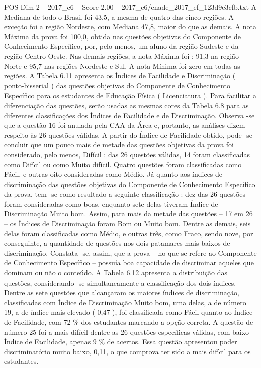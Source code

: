 \begin{textsample}{POS Dim 2 – 2017\_c6 – Score 2.00 – 2017\_c6/enade\_2017\_ef\_123d9e3cfb.txt}
A Mediana de todo o Brasil foi 43,5, a mesma de quatro das cinco regiões.
A exceção foi a região Nordeste, com Mediana 47,8, maior do que as demais.
A nota Máxima da prova foi 100,0, obtida nas questões objetivas do Componente de Conhecimento Específico, por, pelo menos, um aluno da região Sudeste e da região Centro-Oeste.
Nas demais regiões, a nota Máxima foi : 91,3 na região Norte e 95,7 nas regiões Nordeste e Sul.
A nota Mínima foi zero em todas as regiões.
A Tabela 6.11 apresenta os Índices de Facilidade e Discriminação ( ponto-bisserial ) das questões objetivas do Componente de Conhecimento Específico para os estudantes de Educação Física ( Licenciatura ).
Para facilitar a diferenciação das questões, serão usadas as mesmas cores da Tabela 6.8 para as diferentes classificações dos Índices de Facilidade e de Discriminação.
Observa -se que a questão 16 foi anulada pela CAA da Área e, portanto, as análises dizem respeito às 26 questões válidas.
A partir do Índice de Facilidade obtido, pode -se concluir que um pouco mais de metade das questões objetivas da prova foi considerado, pelo menos, Difícil : das 26 questões válidas, 14 foram classificadas como Difícil ou como Muito difícil.
Quatro questões foram classificadas como Fácil, e outras oito consideradas como Médio.
Já quanto aos índices de discriminação das questões objetivas do Componente de Conhecimento Específico da prova, tem -se como resultado a seguinte classificação : dez das 26 questões foram consideradas como boas, enquanto sete delas tiveram Índice de Discriminação Muito bom.
Assim, para mais da metade das questões – 17 em 26 – os Índices de Discriminação foram Bom ou Muito bom.
Dentre as demais, seis delas foram classificadas como Médio, e outras três, como Fraco, sendo nove, por conseguinte, a quantidade de questões nos dois patamares mais baixos de discriminação.
Constata -se, assim, que a prova – no que se refere ao Componente de Conhecimento Específico – possuía boa capacidade de discriminar aqueles que dominam ou não o conteúdo.
A Tabela 6.12 apresenta a distribuição das questões, considerando -se simultaneamente a classificação dos dois índices.
Dentre as sete questões que alcançaram os maiores índices de discriminação, classificadas com Índice de Discriminação Muito bom, uma delas, a de número 19, a de índice mais elevado ( 0,47 ), foi classificada como Fácil quanto ao Índice de Facilidade, com 72 \% dos estudantes marcando a opção correta.
A questão de número 25 foi a mais difícil dentre as 26 questões específicas válidas, com baixo Índice de Facilidade, apenas 9 \% de acertos.
Essa questão apresentou poder discriminatório muito baixo, 0,11, o que comprova ter sido a mais difícil para os estudantes.

\end{textsample}

